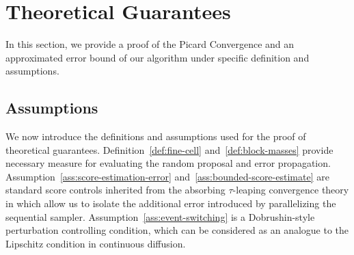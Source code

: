 \documentclass{article}
\newtheorem{theorem}{Theorem}[section]
\begin{document}
\section{Theoretical Guarantees}
\label{sec:theory}
In this section, we provide a proof of the Picard Convergence and an approximated error bound of our algorithm under specific definition and assumptions.





\subsection{Assumptions}
\label{subsec:assumptions}
We now introduce the definitions and assumptions used for the proof of theoretical guarantees. Definition~\ref{def:fine-cell} and~\ref{def:block-masses} provide necessary measure for evaluating the random proposal and error propagation. Assumption~\ref{ass:score-estimation-error} and~\ref{ass:bounded-score-estimate} are standard score controls inherited from the absorbing $\tau$-leaping convergence theory in \citep{liangabsorb} which allow us to isolate the additional error introduced by parallelizing the sequential sampler. Assumption~\ref{ass:event-switching} is a Dobrushin-style perturbation controlling condition, which can be considered as an analogue to the Lipschitz condition in continuous diffusion.
\end{document}
